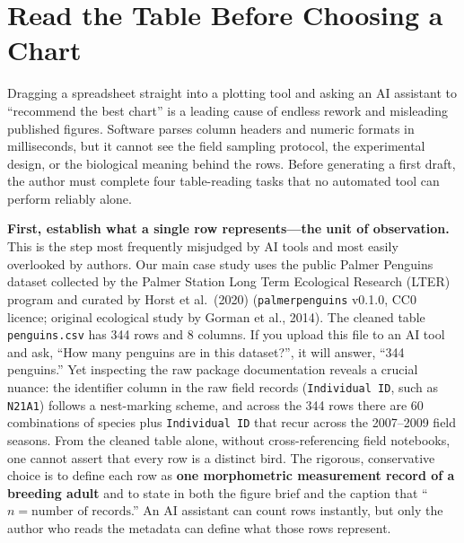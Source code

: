 \section{Read the Table Before Choosing a Chart}

Dragging a spreadsheet straight into a plotting tool and asking an AI assistant to ``recommend the best chart'' is a leading cause of endless rework and misleading published figures. Software parses column headers and numeric formats in milliseconds, but it cannot see the field sampling protocol, the experimental design, or the biological meaning behind the rows. Before generating a first draft, the author must complete four table-reading tasks that no automated tool can perform reliably alone.

\textbf{First, establish what a single row represents—the unit of observation.} This is the step most frequently misjudged by AI tools and most easily overlooked by authors. Our main case study uses the public Palmer Penguins dataset collected by the Palmer Station Long Term Ecological Research (LTER) program and curated by Horst et al.\ (2020) (\texttt{palmerpenguins} v0.1.0, CC0 licence; original ecological study by Gorman et al., 2014). The cleaned table \texttt{penguins.csv} has 344 rows and 8 columns. If you upload this file to an AI tool and ask, ``How many penguins are in this dataset?'', it will answer, ``344 penguins.'' Yet inspecting the raw package documentation reveals a crucial nuance: the identifier column in the raw field records (\texttt{Individual ID}, such as \texttt{N21A1}) follows a nest-marking scheme, and across the 344 rows there are 60 combinations of species plus \texttt{Individual ID} that recur across the 2007--2009 field seasons. From the cleaned table alone, without cross-referencing field notebooks, one cannot assert that every row is a distinct bird. The rigorous, conservative choice is to define each row as \textbf{one morphometric measurement record of a breeding adult} and to state in both the figure brief and the caption that ``$n = \text{number of records}$.'' An AI assistant can count rows instantly, but only the author who reads the metadata can define what those rows represent.


